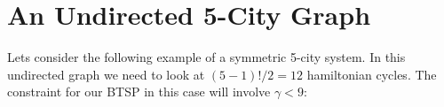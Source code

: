 \documentclass[msc,oneside]{ubcthesis}
\begin{document}
\clearpage


\section{An Undirected 5-City Graph}

	Lets consider the following example of a symmetric 5-city system. In this undirected graph we need to look at $(5-1)!/2 = 12$ hamiltonian cycles. The constraint for our BTSP in this case will involve $\gamma < 9$:
	
%	
%
%	
%	
%	
%	
	
\end{document}
